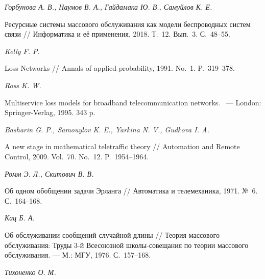 \documentclass[a4paper,12pt]{article}
\begin{document}
\begin{enumerate}





\textit{Горбунова А. В., Наумов В. А., Гайдамака Ю. В., Самуйлов К. Е.}

Ресурсные системы массового обслуживания как модели беспроводных систем связи // {Информатика и её применения}, 2018. Т.~12. Вып.~3. С.~48--55.





\textit{Kelly F. P.}

Loss Networks // {Annals of applied probability}, 1991. No.~1. P.~319--378.





\textit{Ross K. W.}

Multiservice loss models for broadband telecommunication networks. ~--- {London: Springer-Verlag}, 1995. 343 p.





\textit{Basharin G. P., Samouylov K. E., Yarkina N. V., Gudkova I. A.}

A new stage in mathematical teletraffic theory // {Automation and Remote Control}, 2009. Vol.~70. No.~12. P.~1954--1964.





\textit{Ромм Э. Л., Скитович В. В.}

Об одном обобщении задачи Эрланга // {Автоматика и телемеханика}, 1971. №~6. С.~164--168.





\textit{Кац Б. А.}

Об обслуживании сообщений случайной длины // {Теория массового обслуживания: Труды 3-й Всесоюзной школы-совещания по теории массового обслуживания}. --- М.: МГУ, 1976. С.~157--168.





\textit{Тихоненко О. М.}


\end{enumerate}
\end{document}
